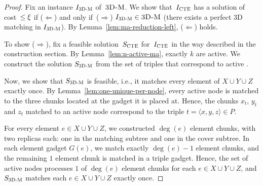 \begin{proof}
  
  Fix an instance $I_{\mathrm{\textsc{3D-M}}}$ of~$\textsc{3D-M}$.
  We show that~$I_{\mathrm{\textsc{CTE}}}$ has a solution of cost~$\leq \xi$ if ($\Leftarrow$) and only if~($\Rightarrow$) $I_{\mathrm{\textsc{3D-M}}} \in \textsc{3D-M}$ (there exists a perfect 3D matching in $I_{\mathrm{\textsc{3D-M}}}$).
  By Lemma~\ref{lem:ma-reduction-left}, ($\Leftarrow$) holds.

  To show ($\Rightarrow$), fix a feasible solution~$S_{\mathrm{\textsc{CTE}}}$ for~$I_{\mathrm{\textsc{CTE}}}$ in the way described in the construction section.
  By Lemma~\ref{lem:n-active-ma}, exactly $k$ \TripleGadgets{} are active.
  We construct the solution $S_{\mathrm{\textsc{3D-M}}}$ from the set of triples that correspond to active \TripleGadgets{}.

  Now, we show that $S_{\mathrm{\textsc{3D-M}}}$ is feasible, i.e., it matches every element of $X\cup Y\cup Z$ exactly once.
  By Lemma~\ref{lem:one-unique-per-node}, every active node is matched to the three chunks located at the gadget it is placed at.
  Hence, the chunks $x_t$, $y_t$ and $z_t$ matched to an active node correspond to the triple $t = \langle x, y, z \rangle \in P$.
  
  For every element $e\in X\cup Y \cup Z$, we constructed $\deg(e)$ element chunks, with two replicas each: one in the matching subtree and one in the cover subtree.
  In each element gadget $G(e)$, we match exactly $\deg(e) - 1$ element chunks, and the remaining $1$ element chunk is matched in a triple gadget.
  Hence, the set of active nodes processes $1$ of $\deg(e)$ element chunks for each $e\in X\cup Y\cup Z$, and $S_{\mathrm{\textsc{3D-M}}}$ matches each $e\in X\cup Y\cup Z$ exactly once.
 
%
  

\end{proof}

